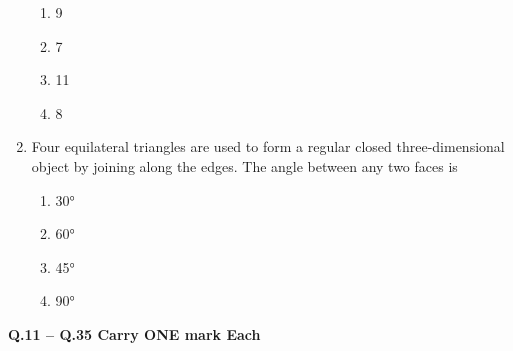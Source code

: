 \documentclass[journal,11pt,onecolumn]{IEEEtran}
\begin{document}
\begin{enumerate}[resume]
          \begin{enumerate}
              \item 9
              \item 7
              \item 11
              \item 8
          \end{enumerate}

    \item Four equilateral triangles are used to form a regular closed three-dimensional object by joining along the edges. The angle between any two faces is

          \begin{enumerate}
              \item 30°
              \item 60°
              \item 45°
              \item 90°
          \end{enumerate}

\end{enumerate}

\large\textbf{Q.11 – Q.35 Carry ONE mark Each}\\
\end{document}
